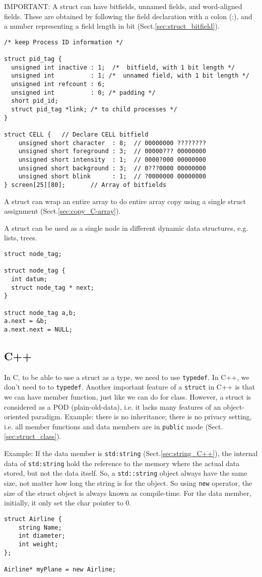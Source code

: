 IMPORTANT: A struct can have bitfields, unnamed fields, and word-aligned fields.
These are obtained by following the field declaration with a colon (:), and a
number representing a field length in bit (Sect.\ref{sec:struct_bitfield}). 
\begin{verbatim}
/* keep Process ID information */

struct pid_tag {
  unsigned int inactive : 1;  /*  bitfield, with 1 bit length */
  unsigned int          : 1; /*  unnamed field, with 1 bit length */
  unsigned int refcount : 6; 
  unsigned int          : 0; /* padding */
  short pid_id;
  struct pid_tag *link; /* to child processes */
}

struct CELL {   // Declare CELL bitfield
    unsigned short character  : 8;  // 00000000 ????????
    unsigned short foreground : 3;  // 00000??? 00000000
    unsigned short intensity  : 1;  // 0000?000 00000000
    unsigned short background : 3;  // 0???0000 00000000
    unsigned short blink      : 1;  // ?0000000 00000000
} screen[25][80];       // Array of bitfields 
\end{verbatim}


A struct can wrap an entire array to do entire array copy using a single
struct assignment (Sect.\ref{sec:copy_C-array}).

A struct can be used as a single node in different dynamic data structures, e.g.
lists, trees.
\begin{verbatim}
struct node_tag;

struct node_tag {
  int datum;
  struct node_tag * next;
}

struct node_tag a,b;
a.next = &b;
a.next.next = NULL;
\end{verbatim}

\subsection{C++}
\label{sec:struct-C++}

In C, to be able to use a struct as a type, we need to use \verb!typedef!. In
C++, we don't need to to \verb!typedef!. Another important feature of a
\verb!struct! in C++ is that we can have member function, just like we can do
for class. However, a struct is considered as a POD (plain-old-data), i.e. it
lacks many features of an object-oriented paradigm.
Example: there is no inheritance; there is no privacy setting, i.e. all member
functions and data members are in \verb!public! mode
(Sect.\ref{sec:struct_class}).


Example: If the data member is \verb!std:string!
(Sect.\ref{sec:string_C++}), the internal data of \verb!std:string! hold the
reference to the memory where the actual data stored, but not the data itself.
So, a \verb!std::string! object always have the same size, not matter how long
the string is for the object. So using \verb!new! operator, the size of the
struct object is always known as compile-time. For the data member, initially, it only set the char
pointer to 0. 
\begin{verbatim}
struct Airline {
    string Name;
    int diameter;
    int weight;
};

Airline* myPlane = new Airline;
\end{verbatim}

